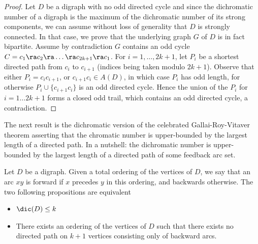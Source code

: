 \begin{proof}
Let $D $ be a digraph with no odd directed cycle and since the dichromatic number of a digraph is the maximum of the dichromatic number of its strong components, we can assume without loss of generality that $D$ is strongly connected. In that case, we prove that the underlying graph $G$ of $D$ is in fact bipartite. Assume by contradiction $G$ contains an odd cycle $C = c_1\ra c_2\ra  \dots\ra  c_{2k+1}\ra c_1$. For $i = 1, \dots, {2k + 1}$, let $P_i$ be a shortest directed path from $c_i$ to $c_{i + 1}$ (indices being taken modulo $2k + 1$). Observe that either $P_i = c_ic_{i+1}$, or $c_{i+1}c_i \in A(D)$, in which case $P_i$ has odd length, for otherwise $P_i \cup \{c_{i+1}c_{i}\}$ is an odd directed cycle.  Hence the union of the $P_i$ for $i = 1 \dots 2k + 1$ forms a closed odd trail, which contains an odd directed cycle, a contradiction. 
\end{proof}


The next result is the dichromatic version of the celebrated Gallai-Roy-Vitaver theorem asserting that the chromatic number is upper-bounded by the largest length of a directed path. In a nutshell: the dichromatic number is upper-bounded by the largest length of a directed path of some feedback arc set.

\begin{proposition}\label{prop:noPk}
Let $D$ be a digraph. Given a total ordering of the vertices of $D$, we say that an arc $xy$ is forward if $x$ precedes $y$ in this ordering, and backwards otherwise. The two following propositions are equivalent 
\begin{itemize}
    \item $\dic(D)\leq k$
    \item There exists an ordering of the vertices of $D$ such that there exists no directed path on $k+1$ vertices consisting only of backward arcs.
\end{itemize}
\end{proposition}


